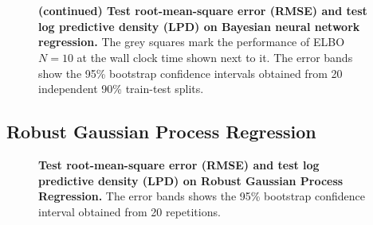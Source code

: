 \begin{figure}[H]
  \centering
  \vspace{0.05in}\\
  \vspace{0.05in}\\
  \caption{\textbf{(continued) Test root-mean-square error (RMSE) and test log predictive density (LPD) on Bayesian neural network regression.}
    The grey squares mark the performance of ELBO \(N=10\) at the wall clock time shown next to it.
  The error bands show the 95\% bootstrap confidence intervals obtained from 20 independent 90\% train-test splits.}
\end{figure}

\subsection{Robust Gaussian Process Regression}\label{section:gp_additional}
\begin{figure}[H]
  \centering
  \caption{\textbf{Test root-mean-square error (RMSE) and test log predictive density (LPD) on Robust Gaussian Process Regression.}
  The error bands shows the 95\% bootstrap confidence interval obtained from 20 repetitions.}
\end{figure}

